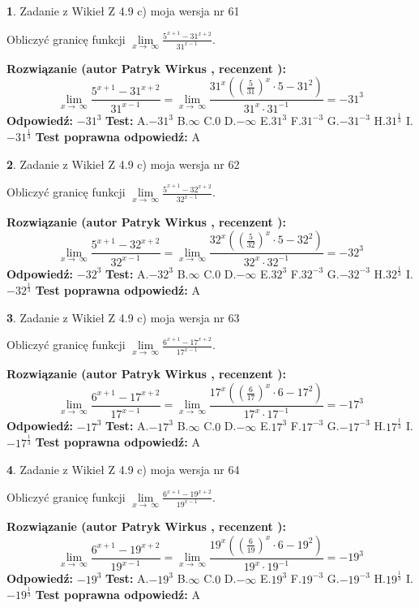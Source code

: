 \documentclass[12pt, a4paper]{article}
\theoremstyle{definition} %
\newtheorem{zad}{}
\newcommand{\zadStart}[1]{\begin{zad}#1\newline}
\newcommand{\zadStop}{\end{zad}}
\newcommand{\rozwStart}[2]{\noindent \textbf{Rozwiązanie (autor #1 , recenzent #2): }\newline}
\newcommand{\rozwStop}{\newline}
\newcommand{\odpStart}{\noindent \textbf{Odpowiedź:}\newline}
\newcommand{\odpStop}{\newline}
\newcommand{\testStart}{\noindent \textbf{Test:}\newline}
\newcommand{\testStop}{\newline}
\newcommand{\kluczStart}{\noindent \textbf{Test poprawna odpowiedź:}\newline}
\newcommand{\kluczStop}{\newline}
\begin{document}
\zadStart{Zadanie z Wikieł Z 4.9 c) moja wersja nr 61}


Obliczyć granicę funkcji  $\lim\limits_{x\to\ \infty}\frac{5^{x+1}-31^{x+2}}{31^{x-1}}$.
\zadStop
\rozwStart{Patryk Wirkus}{}
$$\lim\limits_{x\to\ \infty}\frac{5^{x+1}-31^{x+2}}{31^{x-1}}=\lim\limits_{x\to\ \infty}\frac{31^{x}((\frac{5}{31})^{x}\cdot 5 -31^{2})}{31^{x}\cdot 31^{-1}} = -31^{3}$$
\rozwStop
\odpStart
$-31^{3}$
\odpStop
\testStart
A.$-31^{3}$ B.$\infty$ C.$0$ D.$-\infty$ E.$31^{3}$
F.$31^{-3}$ G.$-31^{-3}$
H.$31^{\frac{1}{3}}$
I.$-31^{\frac{1}{3}}$
\testStop
\kluczStart
A
\kluczStop



\zadStart{Zadanie z Wikieł Z 4.9 c) moja wersja nr 62}


Obliczyć granicę funkcji  $\lim\limits_{x\to\ \infty}\frac{5^{x+1}-32^{x+2}}{32^{x-1}}$.
\zadStop
\rozwStart{Patryk Wirkus}{}
$$\lim\limits_{x\to\ \infty}\frac{5^{x+1}-32^{x+2}}{32^{x-1}}=\lim\limits_{x\to\ \infty}\frac{32^{x}((\frac{5}{32})^{x}\cdot 5 -32^{2})}{32^{x}\cdot 32^{-1}} = -32^{3}$$
\rozwStop
\odpStart
$-32^{3}$
\odpStop
\testStart
A.$-32^{3}$ B.$\infty$ C.$0$ D.$-\infty$ E.$32^{3}$
F.$32^{-3}$ G.$-32^{-3}$
H.$32^{\frac{1}{3}}$
I.$-32^{\frac{1}{3}}$
\testStop
\kluczStart
A
\kluczStop



\zadStart{Zadanie z Wikieł Z 4.9 c) moja wersja nr 63}


Obliczyć granicę funkcji  $\lim\limits_{x\to\ \infty}\frac{6^{x+1}-17^{x+2}}{17^{x-1}}$.
\zadStop
\rozwStart{Patryk Wirkus}{}
$$\lim\limits_{x\to\ \infty}\frac{6^{x+1}-17^{x+2}}{17^{x-1}}=\lim\limits_{x\to\ \infty}\frac{17^{x}((\frac{6}{17})^{x}\cdot 6 -17^{2})}{17^{x}\cdot 17^{-1}} = -17^{3}$$
\rozwStop
\odpStart
$-17^{3}$
\odpStop
\testStart
A.$-17^{3}$ B.$\infty$ C.$0$ D.$-\infty$ E.$17^{3}$
F.$17^{-3}$ G.$-17^{-3}$
H.$17^{\frac{1}{3}}$
I.$-17^{\frac{1}{3}}$
\testStop
\kluczStart
A
\kluczStop



\zadStart{Zadanie z Wikieł Z 4.9 c) moja wersja nr 64}


Obliczyć granicę funkcji  $\lim\limits_{x\to\ \infty}\frac{6^{x+1}-19^{x+2}}{19^{x-1}}$.
\zadStop
\rozwStart{Patryk Wirkus}{}
$$\lim\limits_{x\to\ \infty}\frac{6^{x+1}-19^{x+2}}{19^{x-1}}=\lim\limits_{x\to\ \infty}\frac{19^{x}((\frac{6}{19})^{x}\cdot 6 -19^{2})}{19^{x}\cdot 19^{-1}} = -19^{3}$$
\rozwStop
\odpStart
$-19^{3}$
\odpStop
\testStart
A.$-19^{3}$ B.$\infty$ C.$0$ D.$-\infty$ E.$19^{3}$
F.$19^{-3}$ G.$-19^{-3}$
H.$19^{\frac{1}{3}}$
I.$-19^{\frac{1}{3}}$
\testStop
\kluczStart
A
\kluczStop
\end{document}
